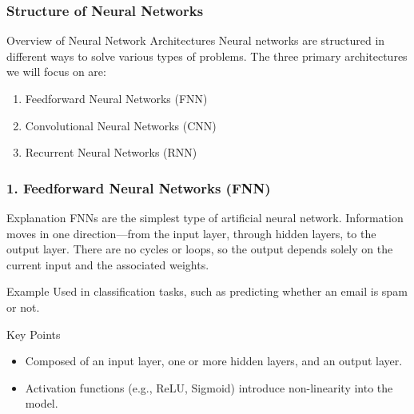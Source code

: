 \documentclass[aspectratio=169]{beamer}
\begin{document}
\begin{frame}[fragile]
  \frametitle{Structure of Neural Networks}
  \begin{block}{Overview of Neural Network Architectures}
    Neural networks are structured in different ways to solve various types of problems. The three primary architectures we will focus on are:
    \begin{enumerate}
      \item Feedforward Neural Networks (FNN)
      \item Convolutional Neural Networks (CNN)
      \item Recurrent Neural Networks (RNN)
    \end{enumerate}
  \end{block}
\end{frame}

\begin{frame}[fragile]
  \frametitle{1. Feedforward Neural Networks (FNN)}
  \begin{block}{Explanation}
    FNNs are the simplest type of artificial neural network. Information moves in one direction—from the input layer, through hidden layers, to the output layer. There are no cycles or loops, so the output depends solely on the current input and the associated weights.
  \end{block}
  
  \begin{block}{Example}
    Used in classification tasks, such as predicting whether an email is spam or not.
  \end{block}
  
  \begin{block}{Key Points}
    \begin{itemize}
      \item Composed of an input layer, one or more hidden layers, and an output layer.
      \item Activation functions (e.g., ReLU, Sigmoid) introduce non-linearity into the model.
    \end{itemize}
  \end{block}
\end{frame}
\end{document}
